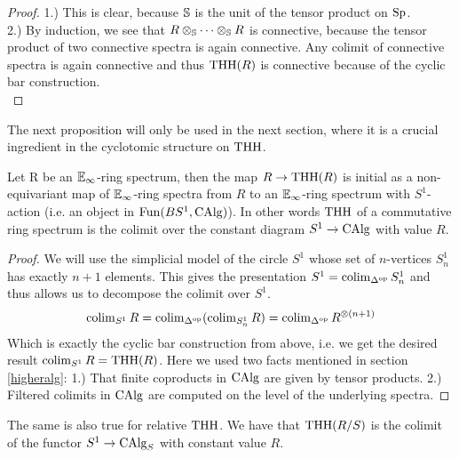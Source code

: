 \begin{proof}
    1.) This is clear, because $\S$ is the unit of the tensor product on $\Sp$. \\
    2.) By induction, we see that $R\otimes_\S\dots\otimes_\S R$ is connective, because the tensor product of two connective spectra is again connective. Any colimit of connective spectra is again connective and thus $\THH(R)$ is connective because of the cyclic bar construction. \\

\end{proof}

The next proposition will only be used in the next section, where it is a crucial ingredient in the cyclotomic structure on $\THH$.
\begin{prop}\cite{mcclureschwaenzlvogt}
\label{McClureSchwaenzlVogt}
Let R be an $\Einf$-ring spectrum, then the map $R\ra \THH(R)$ is initial as a non-equivariant map of $\Einf$-ring spectra from $R$ to an $\Einf$-ring spectrum with $S^1$-action (i.e. an object in $\Fun(BS^1,\CAlg)$). In other words $\THH$ of a commutative ring spectrum is the colimit over the constant diagram $S^1\ra \CAlg$ with value $R$.
\end{prop}
\begin{proof}
    We will use the simplicial model of the circle $S^1$ whose set of $n$-vertices $S_n^1$ has exactly $n+1$ elements. This gives the presentation $S^1=\colim_{\Delta^{\op}}S_n^1$ and thus allows us to decompose the colimit over $S^1$.
    \begin{equation*}
        \colim_{S^1}R=\colim_{\Delta^{\op}}(\colim_{S_n^1}R)=\colim_{\Delta^{\op}}R^{\otimes(n+1)}
    \end{equation*} 
    Which is exactly the cyclic bar construction from above, i.e. we get the desired result $\colim_{S^1}R=\THH(R)$. Here we used two facts mentioned in section \ref{higheralg}: 1.) That finite coproducts in $\CAlg$ are given by tensor products. 2.) Filtered colimits in $\CAlg$ are computed on the level of the underlying spectra.
\end{proof}
The same is also true for relative $\THH$. We have that $\THH(R/S)$ is the colimit of the functor $S^1\ra \CAlg_S$ with constant value $R$.
\\
